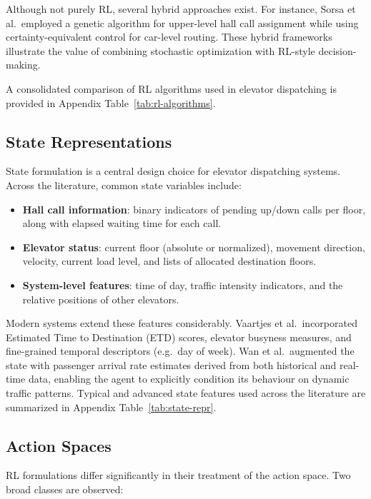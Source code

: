 \documentclass[10pt,twocolumn]{article}
\begin{document}
Although not purely RL, several hybrid approaches exist. For instance, Sorsa et al.\ employed a genetic algorithm for upper-level hall call assignment while using certainty-equivalent control for car-level routing\cite{SORSA2009}. These hybrid frameworks illustrate the value of combining stochastic optimization with RL-style decision-making.

A consolidated comparison of RL algorithms used in elevator dispatching is provided in Appendix Table~\ref{tab:rl-algorithms}.

\subsection{State Representations}

State formulation is a central design choice for elevator dispatching systems. Across the literature, common state variables include:

\begin{itemize}
    \item \textbf{Hall call information}: binary indicators of pending up/down calls per floor, along with elapsed waiting time for each call.
    \item \textbf{Elevator status}: current floor (absolute or normalized), movement direction, velocity, current load level, and lists of allocated destination floors.
    \item \textbf{System-level features}: time of day, traffic intensity indicators, and the relative positions of other elevators.
\end{itemize}

Modern systems extend these features considerably. Vaartjes et al.\ incorporated Estimated Time to Destination (ETD) scores, elevator busyness measures, and fine-grained temporal descriptors (e.g.\ day of week)\cite{VAARTJES2025}. Wan et al.\ augmented the state with passenger arrival rate estimates derived from both historical and real-time data, enabling the agent to explicitly condition its behaviour on dynamic traffic patterns\cite{WAN2024}.
Typical and advanced state features used across the literature are summarized in Appendix Table~\ref{tab:state-repr}.

\subsection{Action Spaces}

RL formulations differ significantly in their treatment of the action space. Two broad classes are observed:
\end{document}
